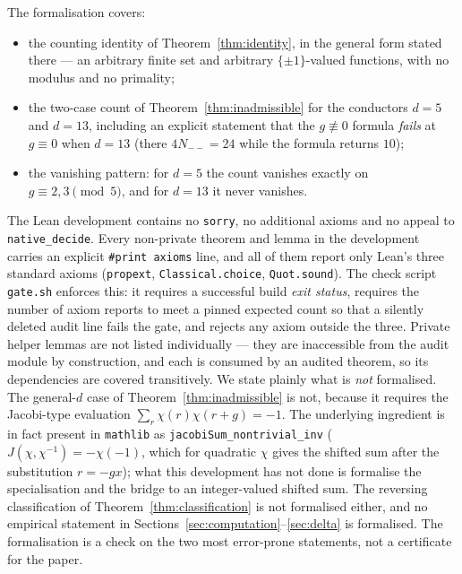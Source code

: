 \documentclass[11pt,reqno]{amsart}
\theoremstyle{plain}
\theoremstyle{definition}
\begin{document}
The formalisation covers:
\begin{itemize}
\item the counting identity of Theorem~\ref{thm:identity}, in the general form
      stated there --- an arbitrary finite set and arbitrary $\{\pm 1\}$-valued
      functions, with no modulus and no primality;
\item the two-case count of Theorem~\ref{thm:inadmissible} for the conductors
      $d = 5$ and $d = 13$, including an explicit statement that the
      $g \not\equiv 0$ formula \emph{fails} at $g \equiv 0$ when $d = 13$
      (there $4N_{--} = 24$ while the formula returns $10$);
\item the vanishing pattern: for $d = 5$ the count vanishes exactly on
      $g \equiv 2, 3 \pmod 5$, and for $d = 13$ it never vanishes.
\end{itemize}

\sloppypar
The Lean development contains no \texttt{sorry}, no additional axioms and no
appeal to \texttt{native\_decide}. Every non-private theorem and lemma in the
development carries an explicit \texttt{\#print axioms} line, and all of them
report only Lean's three standard axioms (\texttt{propext},
\texttt{Classical.choice}, \texttt{Quot.sound}). The check script
\texttt{gate.sh} enforces this: it requires a successful build \emph{exit
status}, requires the number of axiom reports to meet a pinned expected count
so that a silently deleted audit line fails the gate, and rejects any axiom
outside the three. Private helper lemmas are not listed individually --- they
are inaccessible from the audit module by construction, and each is consumed
by an audited theorem, so its dependencies are covered transitively. We state plainly what
is \emph{not} formalised. The general-$d$ case of
Theorem~\ref{thm:inadmissible} is not, because it requires the Jacobi-type
evaluation $\sum_r \chi(r)\chi(r+g) = -1$. The underlying ingredient is in
fact present in \texttt{mathlib} as \texttt{jacobiSum\_nontrivial\_inv}
($J(\chi, \chi^{-1}) = -\chi(-1)$, which for quadratic $\chi$ gives the shifted
sum after the substitution $r = -gx$); what this development has not done is
formalise the specialisation and the bridge to an integer-valued shifted sum. The reversing classification of
Theorem~\ref{thm:classification} is not formalised either, and no empirical
statement in
Sections~\ref{sec:computation}--\ref{sec:delta} is formalised. The
formalisation is a check on the two most error-prone statements, not a
certificate for the paper.
\end{document}
